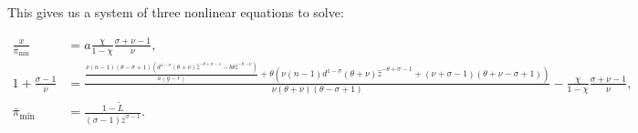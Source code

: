 \documentclass[11pt]{article}
\begin{document}
This gives us a system of three nonlinear equations to solve:

		\begin{align}
		\frac{x}{\bar{\pi}_{\min}} &=  a \frac{\chi}{1-\chi}\frac{\sigma + \nu - 1}{\nu} , \\
		1 + \frac{\sigma - 1}{\nu} &= {\scriptstyle \frac{\frac{\nu  (n-1) (\theta -\sigma +1) \left(d^{1-\sigma } (\theta +\nu ) \hat{z}^{-\theta +\sigma -1}-b \theta  \hat{z}^{-\theta -\nu }\right)}{a (g-r)}+\theta  \left(\nu  (n-1) d^{1-\sigma } (\theta +\nu ) \hat{z}^{-\theta +\sigma -1}+(\nu +\sigma -1) (\theta +\nu -\sigma +1)\right)}{\nu  (\theta +\nu ) (\theta -\sigma +1)} -  \frac{\chi}{1-\chi}\frac{\sigma + \nu - 1}{\nu}} , \\
		\bar{\pi}_{\min} &= \tfrac{1 - \tilde{L}}{(\sigma - 1) \bar{z}^{\sigma - 1}}.
		\end{align}
\end{document}
